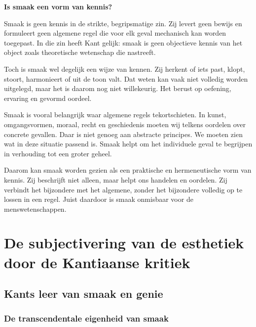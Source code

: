 \documentclass[11pt,twoside,openright]{memoir}
\begin{document}
\bigskip
\noindent
\textbf{Is smaak een vorm van kennis?}
\medskip

Smaak is geen kennis in de strikte, begripsmatige zin. Zij levert geen bewijs en formuleert geen algemene regel die voor elk geval mechanisch kan worden toegepast. In die zin heeft Kant gelijk: smaak is geen objectieve kennis van het object zoals theoretische wetenschap die nastreeft.

Toch is smaak wel degelijk een wijze van kennen. Zij herkent of iets past, klopt, stoort, harmonieert of uit de toon valt. Dat weten kan vaak niet volledig worden uitgelegd, maar het is daarom nog niet willekeurig. Het berust op oefening, ervaring en gevormd oordeel.

Smaak is vooral belangrijk waar algemene regels tekortschieten. In kunst, omgangsvormen, moraal, recht en geschiedenis moeten wij telkens oordelen over concrete gevallen. Daar is niet genoeg aan abstracte principes. We moeten zien wat in deze situatie passend is. Smaak helpt om het individuele geval te begrijpen in verhouding tot een groter geheel.

Daarom kan smaak worden gezien als een praktische en hermeneutische vorm van kennis. Zij beschrijft niet alleen, maar helpt ons handelen en oordelen. Zij verbindt het bijzondere met het algemene, zonder het bijzondere volledig op te lossen in een regel. Juist daardoor is smaak onmisbaar voor de menswetenschappen.


\section{De subjectivering van de esthetiek door de Kantiaanse kritiek}

\subsection{Kants leer van smaak en genie}

\subsubsection{De transcendentale eigenheid van smaak}
\end{document}
